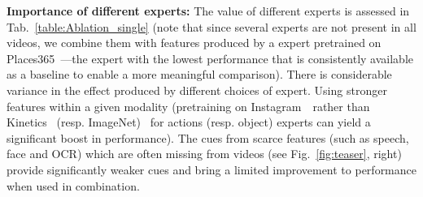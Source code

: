 \documentclass{bmvc2k}
\begin{document}
\noindent \textbf{Importance of different experts:} The value of different experts is assessed in Tab.~\ref{table:Ablation_single} (note that since several experts are not present in all videos, we combine them with features produced by a  expert pretrained on Places365~\cite{zhou2017places}---the expert with the lowest performance that is consistently available as a baseline to enable a more meaningful comparison).  There is considerable variance in the effect produced by different choices of expert.  Using stronger features within a given modality (pretraining on Instagram~\cite{mahajan2018exploring}~rather than Kinetics~\cite{carreira2017quo} (resp.  ImageNet)~\cite{deng2009imagenet} for actions (resp. object) experts can yield a significant boost in performance).  The cues from scarce features (such as speech, face and OCR) which are often missing from videos (see Fig.~\ref{fig:teaser}, right) provide significantly weaker cues and bring a limited improvement to performance when used in combination. 
\end{document}
